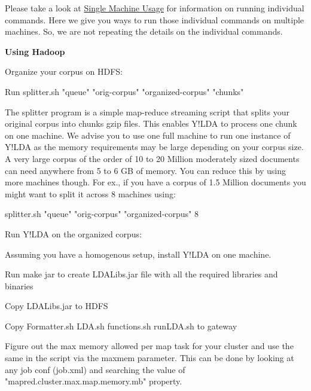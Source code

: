Please take a look at \hyperlink{single__machine__usage}{Single Machine Usage} for information on running individual commands. Here we give you ways to run those individual commands on multiple machines. So, we are not repeating the details on the individual commands. 
\begin{DoxyEnumerate}
\item 

{\bfseries Using Hadoop} 
\begin{DoxyEnumerate}
\item 

Organize your corpus on HDFS: 
\begin{DoxyEnumerate}
\item 

Run {\ttfamily splitter.sh "queue" "orig-\/corpus" "organized-\/corpus" "chunks"} 

The splitter program is a simple map-\/reduce streaming script that splits your original corpus into chunks gzip files. This enables Y!LDA to process one chunk on one machine. We advise you to use one full machine to run one instance of Y!LDA as the memory requirements may be large depending on your corpus size. A very large corpus of the order of 10 to 20 Million moderately sized documents can need anywhere from 5 to 6 GB of memory. You can reduce this by using more machines though. For ex., if you have a corpus of 1.5 Million documents you might want to split it across 8 machines using: 

{\ttfamily splitter.sh "queue" "orig-\/corpus" "organized-\/corpus" 8} 
\end{DoxyEnumerate}
\item 

Run Y!LDA on the organized corpus: 
\begin{DoxyEnumerate}
\item 

Assuming you have a homogenous setup, install Y!LDA on one machine. 
\item 

Run make jar to create LDALibs.jar file with all the required libraries and binaries 
\item 

Copy LDALibs.jar to HDFS 
\item 

Copy Formatter.sh LDA.sh functions.sh runLDA.sh to gateway 
\item 

Figure out the max memory allowed per map task for your cluster and use the same in the script via the maxmem parameter. This can be done by looking at any job conf (job.xml) and searching the value of "mapred.cluster.max.map.memory.mb" property. 
\item 


\end{DoxyEnumerate}
\end{DoxyEnumerate}
\end{DoxyEnumerate}
